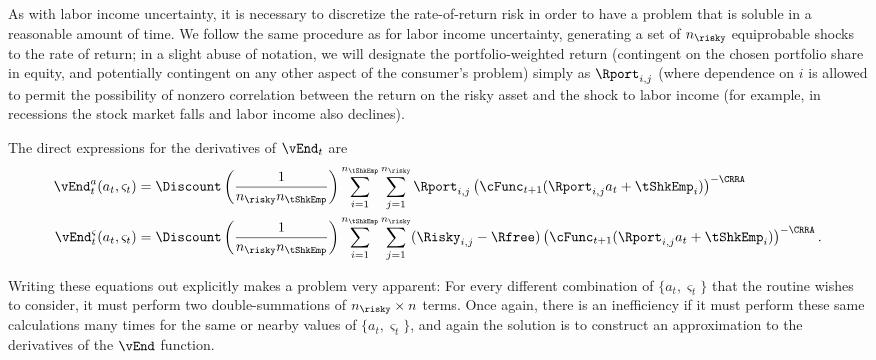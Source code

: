 \documentclass[titlepage]{\econtex}
\begin{document}
As with labor income uncertainty, it is necessary to discretize the
rate-of-return risk in order to have a problem that is soluble in a
reasonable amount of time.  We follow the same procedure as for labor
income uncertainty, generating a set of $n_{\risky}$ equiprobable shocks to the
rate of return; in a slight abuse of notation, we will designate
the portfolio-weighted return (contingent on the
chosen portfolio share in equity, and potentially contingent on any other
aspect of the consumer's problem) simply as $\Rport_{i,j}$ (where dependence
on $i$ is allowed to permit the possibility of nonzero correlation
between the return on the risky asset and the shock to labor income (for example,
in recessions the stock market falls and labor income also declines).

The direct expressions for the derivatives of $\vEnd_{t}$ are
\begin{equation}\begin{gathered}\begin{aligned}
  \vEnd_{t}^{{a}}({a}_{t},\varsigma_{t})  & = \Discount \left(\frac{1}{n_{\risky} n_{\tShkEmp}}\right)\sum_{i=1}^{n_{\tShkEmp}}\sum_{j=1}^{n_{\risky} }\Rport_{i,j} \left(\cFunc_{t+1}(\Rport_{i,j}{a}_{t}+\tShkEmp_{i})\right)^{-\CRRA}
  \\      \vEnd_{t}^{\varsigma}({a}_{t},\varsigma_{t})  & = \Discount \left(\frac{1}{n_{\risky} n_{\tShkEmp}}\right)\sum_{i=1}^{n_{\tShkEmp}}\sum_{j=1}^{n_{\risky} }(\Risky_{i,j}-\Rfree)\left(\cFunc_{t+1}(\Rport_{i,j}{a}_{t}+\tShkEmp_{i})\right)^{-\CRRA}.
\end{aligned}\end{gathered}\end{equation}

Writing these equations out explicitly makes a problem very
apparent: For every different combination of $\{{a}_{t},\varsigma_{t}\}$
that the routine wishes to consider, it must perform two
double-summations of $n_{\risky} \times n$ terms.  Once again, there is an
inefficiency if it must perform these same calculations many times
for the same or nearby values of $\{{a}_{t},\varsigma_{t}\}$, and again
the solution is to construct an approximation to the derivatives of
the $\vEnd$ function.
\end{document}
